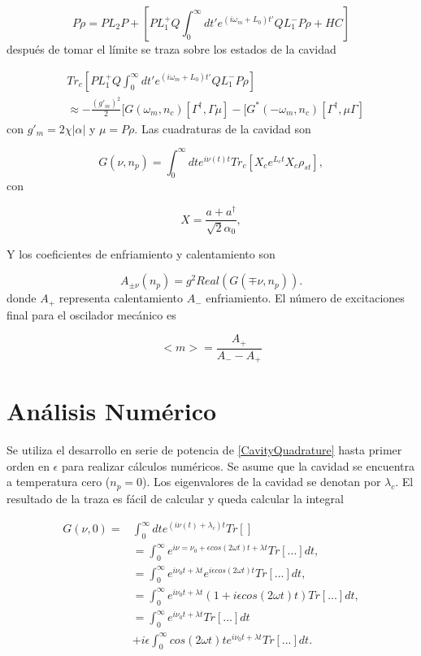 \documentclass[10pt,a4paper]{report}
\begin{document}
\begin{equation}
P\dot{\rho} = PL_2P + [PL^+_1Q \int_0^\infty dt' e^{(i\omega_m +L_0)t'}QL_1^- P\rho + HC]
\end{equation} después de tomar el límite se traza sobre los estados de la cavidad

\begin{align}
&Tr_c[PL^+_1Q \int_0^\infty dt' e^{(i\omega_m +L_0)t'}QL_1^- P\rho] \\
&\approx -\frac{(g'_m)^2}{2}[G(\omega_m,n_c)[\Gamma^\dagger,\Gamma\mu]-[G^*(-\omega_m,n_c)[\Gamma^\dagger,\mu\Gamma] \nonumber
\end{align} con $g'_m = 2\chi|\alpha|$ y $\mu = P\rho$. Las cuadraturas de la cavidad son

\begin{equation} \label{CavityQuadrature}
G(\nu,n_p) = \int_0^\infty dt e^{i\nu(t) t}Tr_c[X_c e^{L_c t} X_c \rho_{st}],
\end{equation} con 


\begin{equation}
X = \frac{a + a^\dagger}{\sqrt{2}\alpha_0},
\end{equation}

Y los coeficientes de enfriamiento y calentamiento son


\begin{equation}
A_{\pm \nu}(n_p) = g^2Real(G(\mp \nu,n_p)).
\end{equation} donde $A_+$ representa calentamiento $A_-$ enfriamiento. El número de excitaciones final para el oscilador mecánico es

\begin{equation}
<m> = \frac{A_+}{A_- - A_+}
\end{equation}

\section{Análisis Numérico}

Se utiliza el desarrollo en serie de potencia de \eqref{CavityQuadrature} hasta primer orden en $\epsilon$ para realizar cálculos numéricos. Se asume que la cavidad se encuentra a temperatura cero ($n_p=0$). Los eigenvalores de la cavidad se denotan por $\lambda_c$. El resultado de la traza es fácil de calcular y queda calcular la integral


\begin{align}
G(\nu,0)=&\int_0^\infty dt e^{(i\nu(t)+\lambda_c) t}Tr[]\\
&= \int_0^\infty e^{i \nu = \nu_0 + \epsilon cos(2\omega t) t + \lambda t} Tr[...]dt, \\
&=\int_0^\infty e^{i \nu_0 t + \lambda t}e^{i \epsilon cos(2\omega t)t} Tr[...]dt, \\
&=\int_0^\infty e^{i \nu_0 t + \lambda t}(1+i \epsilon cos(2\omega t)t) Tr[...]dt, \\
&=\int_0^\infty e^{i \nu_0 t + \lambda t}Tr[...]dt\\
&+i\epsilon\int_0^\infty cos(2\omega t)t e^{i \nu_0 t + \lambda t}Tr[...]dt.
\end{align}
\end{document}
